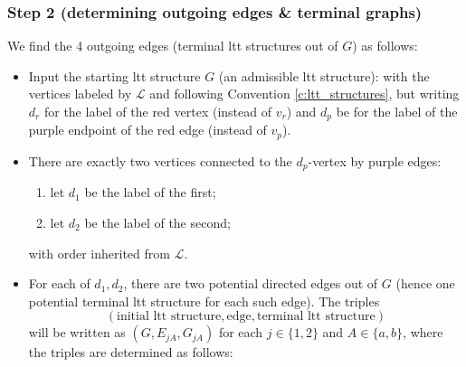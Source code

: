 \documentclass[11pt]{article}
\theoremstyle{definition}
\begin{document}
\subsubsection{Step 2 (determining outgoing edges \& terminal graphs)}

We find the 4 outgoing edges (terminal ltt structures out of $G$) as follows:
\begin{itemize}
  \item Input the starting ltt structure $G$ (an admissible ltt structure):
        with the vertices labeled by $\mathcal{L}$ and following Convention \ref{c:ltt_structures}, but writing $d_r$ for the label of the red vertex (instead of $v_r$) and $d_p$ be for the label of the purple endpoint of the red edge (instead of $v_p$).
  \item There are exactly two vertices connected to the $d_p$-vertex by purple edges:
        \begin{enumerate}[label=\arabic*)]
          \item let $d_1$ be the label of the first;
          \item let $d_2$ be the label of the second;
        \end{enumerate}
        with order inherited from $\mathcal{L}$.
  \item For each of $d_1,d_2$, there are two potential directed edges out of $G$
        (hence one potential terminal ltt structure for each such edge). The triples 
        $$(\text{initial ltt structure}, \text{edge}, \text{terminal ltt structure})$$ 
        will be written as $(G, E_{jA}, G_{jA})$ for each $j\in\{1,2\}$ and $A\in\{a,b\}$, where the triples are determined as follows:
\end{itemize}
\end{document}
